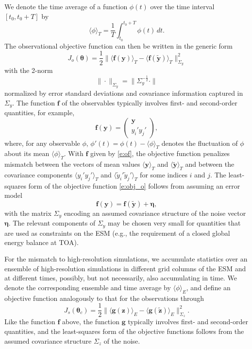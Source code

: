 \documentclass[draft]{agujournal}
\renewcommand{\vec}[1]{\boldsymbol{{#1}}}
\begin{document}
We denote the time average of a function $\phi(t)$ over the time interval $[t_0,t_0+T]$ by
\begin{equation}\label{e:Tavg}
\langle \phi \rangle_T = \frac{1}{T} \int_{t_0}^{t_0+T} \phi(t) \, dt.
\end{equation}
The observational objective function can then be written in the generic form
\begin{equation}\label{e:obj_o}
J_o(\vec{\theta})=\frac12\| \langle \vec{f}(\vec{y})  \rangle_T - \langle \vec{f}(\vec{\tilde y})
\rangle_T \|_{\Sigma_y}^2
\end{equation}
with the 2-norm
\begin{equation}
\|\cdot\|_{\Sigma_y}=\|\Sigma_y^{-\frac12}\cdot\|
\end{equation}
normalized by error standard deviations and covariance information captured in $\Sigma_y$. The function
$\vec{f}$ of the observables typically involves first- and second-order quantities, for example,
\begin{equation}
\vec{f}(\vec{y}) = \left( 
\begin{array}{c} 
\vec{y}\\
y_i' y_j'
\end{array}
\right),
\label{e:of}
\end{equation}
where, for any observable $\phi$, $\phi'(t) = \phi(t) - \langle \phi \rangle_T$ denotes the fluctuation of $\phi$ about its mean $\langle \phi \rangle_T$. With $\vec{f}$ given by \eqref{e:of}, the objective function penalizes mismatch between the vectors of mean values $\langle \vec{y} \rangle_T$ and $\langle \vec{\tilde y}\rangle_T$ and between the covariance components $\langle y_i' y_j' \rangle_T$ and  $\langle \tilde y_i' \tilde y_j' \rangle_T$ for some indices $i$ and $j$. The least-squares form of the objective function \eqref{e:obj_o} follows from assuming an error model
\begin{equation}
\vec{f}(\vec{y})=\vec{f}(\vec{\tilde y})+\vec{\eta},
\end{equation}
with the matrix $\Sigma_y$ encoding an assumed covariance structure of the noise vector $\vec{\eta}$. The relevant components of $\Sigma_y$ may be chosen very small for quantities that are used as constraints on the ESM (e.g., the requirement of a closed global energy balance at TOA).

For the mismatch to high-resolution simulations, we accumulate statistics over an ensemble of high-resolution simulations in different grid columns of the ESM and at different times, possibly, but not necessarily, also accumulating in time. We denote the corresponding ensemble and time average by $\langle \phi \rangle_E$, and define an objective function analogously to that for the observations through
\begin{equation}\label{e:obj_hr}
J_s(\vec{\theta}_c)=\frac12\| \langle \vec{g}(\vec{z})  \rangle_E - \langle \vec{g}(\vec{\tilde z})
\rangle_E \|_{\Sigma_z}^2.
\end{equation}
Like the function $\vec{f}$ above, the function $\vec{g}$  typically involves first- and second-order quantities, and the least-squares form of the objective functions follows from the assumed covariance structure $\Sigma_z$ of the noise. 
\end{document}
